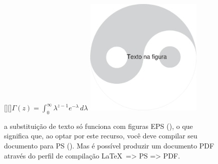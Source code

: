 \documentclass[a4paper,12pt]{article}
\begin{document}
	\begin{figure}
		\centering
		[][]{$\displaystyle\Gamma(z) = \int_0^\infty \lambda^{z-1} e^{-\lambda}\, d\lambda$}
		\includegraphics[width=0.5\textwidth]{Tei-Gi.eps}
		\caption{a substituição de texto só funciona com figuras EPS (), o que significa que, ao optar por este recurso, você deve compilar seu documento para PS (). Mas é possível produzir um documento PDF através do perfil de compilação \LaTeX\ => PS => PDF.}
	\end{figure}
\end{document}
